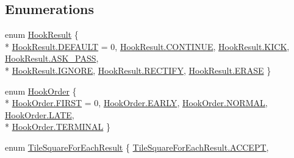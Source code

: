 \subsection*{Enumerations}
\begin{DoxyCompactItemize}
\item 
enum \hyperlink{namespace_o_t_a_1_1_plugin_aa8957fb16676ac9d82aba4aec342737f}{Hook\+Result} \{ \\*
\hyperlink{namespace_o_t_a_1_1_plugin_aa8957fb16676ac9d82aba4aec342737fa5b39c8b553c821e7cddc6da64b5bd2ee}{Hook\+Result.\+D\+E\+F\+A\+U\+L\+T} = 0, 
\hyperlink{namespace_o_t_a_1_1_plugin_aa8957fb16676ac9d82aba4aec342737fa2f453cfe638e57e27bb0c9512436111e}{Hook\+Result.\+C\+O\+N\+T\+I\+N\+U\+E}, 
\hyperlink{namespace_o_t_a_1_1_plugin_aa8957fb16676ac9d82aba4aec342737fa959a795d5524bd9054026703a33afb87}{Hook\+Result.\+K\+I\+C\+K}, 
\hyperlink{namespace_o_t_a_1_1_plugin_aa8957fb16676ac9d82aba4aec342737fa3d0365d138cbf5de714da9272f55d613}{Hook\+Result.\+A\+S\+K\+\_\+\+P\+A\+S\+S}, 
\\*
\hyperlink{namespace_o_t_a_1_1_plugin_aa8957fb16676ac9d82aba4aec342737faa2e843feab94ef623fea888f07c28696}{Hook\+Result.\+I\+G\+N\+O\+R\+E}, 
\hyperlink{namespace_o_t_a_1_1_plugin_aa8957fb16676ac9d82aba4aec342737fa356ebd893493576cffb5c23e39866518}{Hook\+Result.\+R\+E\+C\+T\+I\+F\+Y}, 
\hyperlink{namespace_o_t_a_1_1_plugin_aa8957fb16676ac9d82aba4aec342737fab6e3cc3e31aee770c3fb88b25fc68b6e}{Hook\+Result.\+E\+R\+A\+S\+E}
 \}
\item 
enum \hyperlink{namespace_o_t_a_1_1_plugin_a1030f4a1f490e336a706685a767f6874}{Hook\+Order} \{ \\*
\hyperlink{namespace_o_t_a_1_1_plugin_a1030f4a1f490e336a706685a767f6874a2c2624a5059934a947d6e25fe8332ade}{Hook\+Order.\+F\+I\+R\+S\+T} = 0, 
\hyperlink{namespace_o_t_a_1_1_plugin_a1030f4a1f490e336a706685a767f6874aa79b9a2a9a393db21d39924677c583fc}{Hook\+Order.\+E\+A\+R\+L\+Y}, 
\hyperlink{namespace_o_t_a_1_1_plugin_a1030f4a1f490e336a706685a767f6874a1e23852820b9154316c7c06e2b7ba051}{Hook\+Order.\+N\+O\+R\+M\+A\+L}, 
\hyperlink{namespace_o_t_a_1_1_plugin_a1030f4a1f490e336a706685a767f6874a7f02e16a4a58bd05e37735a3c763cf81}{Hook\+Order.\+L\+A\+T\+E}, 
\\*
\hyperlink{namespace_o_t_a_1_1_plugin_a1030f4a1f490e336a706685a767f6874a6c7748bd0ad3fbdff996e81581ad64d6}{Hook\+Order.\+T\+E\+R\+M\+I\+N\+A\+L}
 \}
\item 
enum \hyperlink{namespace_o_t_a_1_1_plugin_a5d0abd9c98c033ee111105f146881968}{Tile\+Square\+For\+Each\+Result} \{ \hyperlink{namespace_o_t_a_1_1_plugin_a5d0abd9c98c033ee111105f146881968a1fd72e016e8fbf2cf1f0c918dcd9bad3}{Tile\+Square\+For\+Each\+Result.\+A\+C\+C\+E\+P\+T}, 

\end{DoxyCompactItemize}
